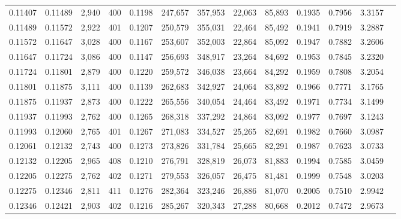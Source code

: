 \begin{tabular}{rrrrrrrrrrrrr}
0.11407 & 0.11489 &  2,940 & 400 &                                     0.1198 & 247,657 & 357,953 &  22,063 &  85,893 & 0.1935 & 0.7956 & 3.3157 \\
0.11489 & 0.11572 &  2,922 & 401 &                                     0.1207 & 250,579 & 355,031 &  22,464 &  85,492 & 0.1941 & 0.7919 & 3.2887 \\
0.11572 & 0.11647 &  3,028 & 400 &                                     0.1167 & 253,607 & 352,003 &  22,864 &  85,092 & 0.1947 & 0.7882 & 3.2606 \\
0.11647 & 0.11724 &  3,086 & 400 &                                     0.1147 & 256,693 & 348,917 &  23,264 &  84,692 & 0.1953 & 0.7845 & 3.2320 \\
0.11724 & 0.11801 &  2,879 & 400 &                                     0.1220 & 259,572 & 346,038 &  23,664 &  84,292 & 0.1959 & 0.7808 & 3.2054 \\
0.11801 & 0.11875 &  3,111 & 400 &                                     0.1139 & 262,683 & 342,927 &  24,064 &  83,892 & 0.1966 & 0.7771 & 3.1765 \\
0.11875 & 0.11937 &  2,873 & 400 &                                     0.1222 & 265,556 & 340,054 &  24,464 &  83,492 & 0.1971 & 0.7734 & 3.1499 \\
0.11937 & 0.11993 &  2,762 & 400 &                                     0.1265 & 268,318 & 337,292 &  24,864 &  83,092 & 0.1977 & 0.7697 & 3.1243 \\
0.11993 & 0.12060 &  2,765 & 401 &                                     0.1267 & 271,083 & 334,527 &  25,265 &  82,691 & 0.1982 & 0.7660 & 3.0987 \\
0.12061 & 0.12132 &  2,743 & 400 &                                     0.1273 & 273,826 & 331,784 &  25,665 &  82,291 & 0.1987 & 0.7623 & 3.0733 \\
0.12132 & 0.12205 &  2,965 & 408 &                                     0.1210 & 276,791 & 328,819 &  26,073 &  81,883 & 0.1994 & 0.7585 & 3.0459 \\
0.12205 & 0.12275 &  2,762 & 402 &                                     0.1271 & 279,553 & 326,057 &  26,475 &  81,481 & 0.1999 & 0.7548 & 3.0203 \\
0.12275 & 0.12346 &  2,811 & 411 &                                     0.1276 & 282,364 & 323,246 &  26,886 &  81,070 & 0.2005 & 0.7510 & 2.9942 \\
0.12346 & 0.12421 &  2,903 & 402 &                                     0.1216 & 285,267 & 320,343 &  27,288 &  80,668 & 0.2012 & 0.7472 & 2.9673 \\

\end{tabular}
